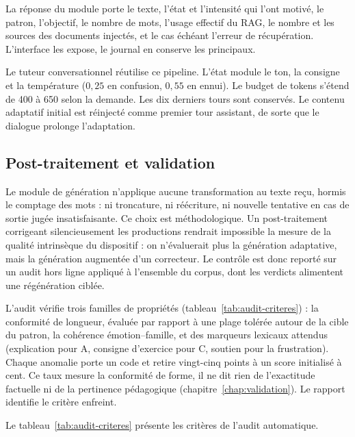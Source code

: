 La réponse du module porte le texte, l'état et l'intensité qui l'ont
motivé, le patron, l'objectif, le nombre de mots, l'usage effectif du
RAG, le nombre et les sources des documents injectés, et le cas
échéant l'erreur de récupération. L'interface les expose, le journal
en conserve les principaux.

Le tuteur conversationnel réutilise ce pipeline. L'état module le
ton, la consigne et la température ($0{,}25$ en confusion, $0{,}55$
en ennui). Le budget de tokens s'étend de 400 à 650 selon la
demande. Les dix derniers tours sont conservés. Le contenu adaptatif
initial est réinjecté comme premier tour assistant, de sorte que le
dialogue prolonge l'adaptation.

\subsection{Post-traitement et validation}
\label{subsec:impl-postproc}

Le module de
génération n'applique aucune transformation au texte reçu, hormis le comptage des
mots : ni troncature, ni réécriture, ni nouvelle tentative en cas de sortie jugée
insatisfaisante. Ce choix est méthodologique. Un post-traitement corrigeant
silencieusement les productions rendrait impossible la mesure de la qualité
intrinsèque du dispositif : on n'évaluerait plus la génération adaptative, mais la
génération augmentée d'un correcteur. Le contrôle est donc reporté sur un
audit hors ligne appliqué à l'ensemble du corpus, dont les verdicts
alimentent une régénération ciblée.

L'audit vérifie trois familles de
propriétés (tableau~\ref{tab:audit-criteres}) : la conformité de longueur,
évaluée par rapport à une plage tolérée autour de la cible du patron, la
cohérence émotion--famille, et des marqueurs lexicaux attendus (explication
pour A, consigne d'exercice pour C, soutien pour la frustration). Chaque
anomalie porte un code et retire vingt-cinq points à un score initialisé à
cent. Ce taux mesure la conformité de forme, il ne dit rien de
l'exactitude factuelle ni de la pertinence pédagogique
(chapitre~\ref{chap:validation}). Le rapport identifie le critère
enfreint.

Le tableau~\ref{tab:audit-criteres} présente les critères de l'audit automatique.

